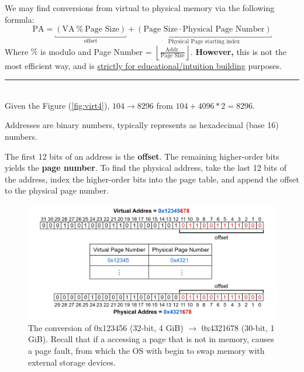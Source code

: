 \newpage 
\begin{Example}

    \label{theo:virt2phys}
    We may find conversions from virtual to physical memory via the following formula: $$\text{PA} = \underbracket{(\text{VA}\ \%\ \text{Page Size})}_{\text{offset}} + \underbracket{(\text{Page Size} \cdot \text{Physical Page Number})}_{\text{Physical Page starting index}}$$
    \noindent
    Where $\%$ is modulo and Page Number = $\left\lfloor \frac{\text{Addr.}}{\text{Page Size}} \right\rfloor$. \textbf{However,} this is not the most efficient way,
    and is \underline{strictly for educational/intuition building} purposes.\\

    \noindent
    \rule{\textwidth}{0.4pt}\\

    \noindent
    Given the Figure (\ref{fig:virt4}), $104\to 8296$ from $104 + 4096 * 2 = 8296$.
\end{Example}
\begin{theo}

    Addresses are binary numbers, typically represents as hexadecimal (base 16) numbers.


    The first 12 bits of an address is the \textbf{offset}. The remaining higher-order bits yields the \textbf{page number}. To find the physical address, take the last 12 bits of the address, index the higher-order bits into the page table, and append the offset to the physical page number.
\end{theo}

\begin{figure}[h]
    \centering
    \includegraphics[width=\textwidth]{Sections/virt/conv.png}
    
    \vspace{1em}
    \caption{The conversion of 0x123456 (32-bit, 4 GiB) $\to$ 0x4321678 (30-bit, 1 GiB). Recall that if a accessing a page that is not in memory, causes a page fault, from which the OS with begin to swap memory with external storage devices.}
    
    \label{fig:virt5}
\end{figure}

